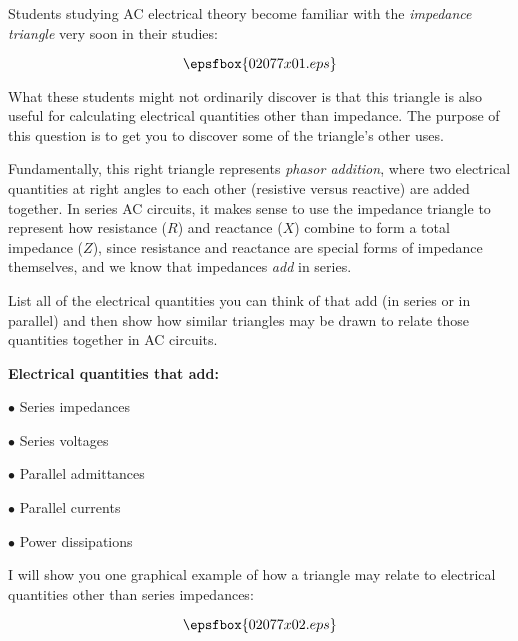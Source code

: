 

Students studying AC electrical theory become familiar with the {\it impedance triangle} very soon in their studies:

$$\epsfbox{02077x01.eps}$$

What these students might not ordinarily discover is that this triangle is also useful for calculating electrical quantities other than impedance.  The purpose of this question is to get you to discover some of the triangle's other uses.

Fundamentally, this right triangle represents {\it phasor addition}, where two electrical quantities at right angles to each other (resistive versus reactive) are added together.  In series AC circuits, it makes sense to use the impedance triangle to represent how resistance ($R$) and reactance ($X$) combine to form a total impedance ($Z$), since resistance and reactance are special forms of impedance themselves, and we know that impedances {\it add} in series.

List all of the electrical quantities you can think of that add (in series or in parallel) and then show how similar triangles may be drawn to relate those quantities together in AC circuits.







\goodbreak

\noindent
{\bf Electrical quantities that add:}

\medskip
\item{$\bullet$} Series impedances
\item{$\bullet$} Series voltages
\item{$\bullet$} Parallel admittances
\item{$\bullet$} Parallel currents
\item{$\bullet$} Power dissipations
\medskip

I will show you one graphical example of how a triangle may relate to electrical quantities other than series impedances:

$$\epsfbox{02077x02.eps}$$







